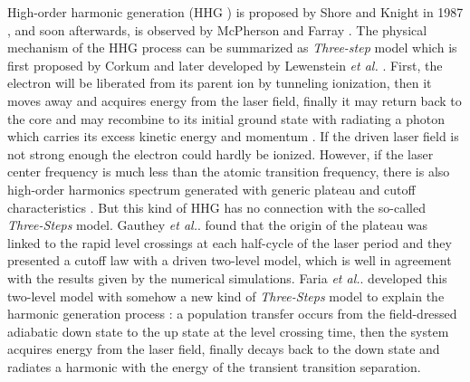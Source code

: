 \documentclass[10pt,letterpaper]{article}
\begin{document}
High-order harmonic generation (HHG ) is proposed by Shore and Knight in 1987 \cite{Shore-HHG-Origin-JPB-1987}, and soon afterwards, is observed by McPherson \cite{McPherson-Early-HHG-JOSAB-1987} and Farray \cite{Ferray-Early-HHG-JPB-1988}. The physical mechanism of the HHG process can be summarized as \emph{Three-step} model which is first proposed by Corkum \cite{Corkum-PRL-1993} and later developed by Lewenstein \emph{et al.} \cite{Lewenstein-SFA-PRA-1994} . First, the electron will be liberated from its parent ion by tunneling ionization, then it moves away and acquires energy from the laser field, finally it may return back to the core and may recombine to its initial ground state with radiating a photon which carries its excess kinetic energy and momentum \cite{1997Review}. If the driven laser field is not strong enough the electron could hardly be ionized. However, if the laser center frequency is much less than the atomic transition frequency, there is also high-order harmonics spectrum generated with generic plateau and cutoff characteristics \cite{Sundaram-Early-Two-Level-PRA-1990,Ivanov-Early-Two-Level-PRA-1993,Kaplan-Early-Two-Level-PRA-1994,Gauthey-Early-Two-Level-PRA-1997}. But this kind of HHG has no connection with the so-called \emph{Three-Steps} model. Gauthey \emph{et al.}. \cite{Gauthey-Early-Two-Level-PRA-1997} found that the origin of the plateau was linked to the rapid level crossings at each half-cycle of the laser period and they presented a cutoff law with a driven two-level model, which is well in agreement with the results given by the numerical simulations. Faria \emph{et al.}. \cite{Faria-Two-Level-Three-Step-PRA-2002} developed this two-level model with somehow a new kind of \emph{Three-Steps} model to explain the harmonic generation process : a population transfer occurs from the field-dressed adiabatic down state to the up state at the level crossing time, then the system acquires energy from the laser field, finally decays back to the down state and radiates a harmonic with the energy of the transient transition separation. 
\end{document}
